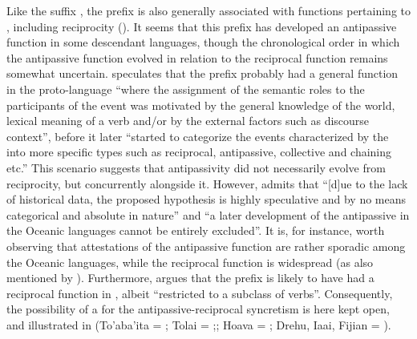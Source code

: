 Like the  suffix , the  prefix  is also generally associated with functions pertaining to , including reciprocity (). It seems that this prefix has developed an antipassive function in some descendant languages, though the chronological order in which the antipassive function evolved in relation to the reciprocal function remains somewhat uncertain. \citet[178]{janic:2016} speculates that the prefix probably had a general function in the proto-language “where the assignment of the semantic roles to the participants of the event was motivated by the general knowledge of the world, lexical meaning of a verb and/or by the external factors such as discourse context”, before it later “started to categorize the events characterized by the  into more specific types such as reciprocal, antipassive, collective and chaining etc.” This scenario suggests that antipassivity did not necessarily evolve from reciprocity, but concurrently alongside it. However, \citet[178f.]{janic:2016} admits that “[d]ue to the lack of historical data, the proposed hypothesis is highly speculative and by no means categorical and absolute in nature” and “a later development of the antipassive in the Oceanic languages cannot be entirely excluded”. It is, for instance, worth observing that attestations of the antipassive function are rather sporadic among the Oceanic languages, while the reciprocal function is widespread (as also mentioned by \citealt[160]{janic:2016}). Furthermore, \citet[151]{pawley:1973} argues that the prefix  is likely to have had a reciprocal function in , albeit “restricted to a subclass of verbs”. Consequently, the possibility of a  for the antipassive-reciprocal syncretism is here kept open, and illustrated in  (To’aba’ita = \citealt[1552, 1560]{lichtenberk:2007}; Tolai = \citealt[146f.]{mosel:1984};; Hoava = \citealt[136f.]{davis:2003}; Drehu, Iaai, Fijian = \citealt[35ff., 47, 57]{bril:2005}).

